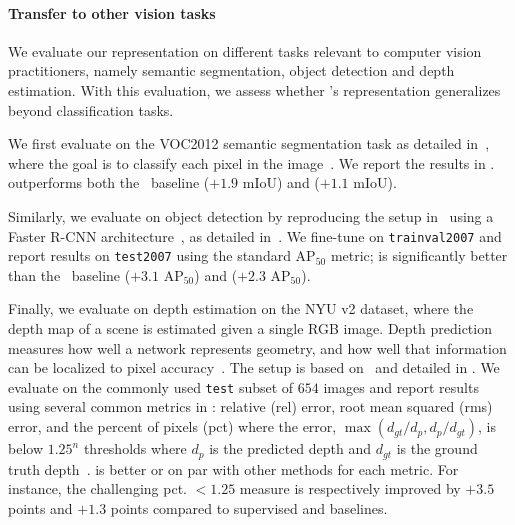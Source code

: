 \begin{table}[t]
    \centering
    \scriptsize
    
     \vspace{0.5em}
     \caption{Transfer learning results from ImageNet (IN) with the standard ResNet-50 architecture.}
     \label{tab:transfer_learning}
     \vspace{-0.8em}
\end{table}

\paragraph{Transfer to other vision tasks} We evaluate our representation on different tasks relevant to computer vision practitioners, namely semantic segmentation, object detection and depth estimation. With this evaluation, we assess whether \algo's representation generalizes beyond classification tasks.

We first evaluate \algo on the VOC2012 semantic segmentation task as detailed in~, where the goal is to classify each pixel in the image~\cite{long2015fully}. We report the results in . \algo outperforms both the \supervisedbaseline~baseline ($+1.9$ mIoU) and \simclr ($+1.1$ mIoU).

Similarly, we evaluate on object detection by reproducing the setup in~\cite{MOCO} using a Faster R-CNN architecture~\cite{ren2015faster}, as detailed in~. We fine-tune on  \texttt{trainval2007\xspace} and report results on  \texttt{test2007\xspace} using the standard AP$_{50}$ metric; \algo is significantly better than the \supervisedbaseline~baseline ($+3.1$ AP$_{50}$) and \simclr ($+2.3$ AP$_{50}$).

Finally, we evaluate on depth estimation on the NYU v2 dataset, where the depth map of a scene is estimated given a single RGB image. Depth prediction measures how well a network represents geometry, and how well that information can be localized to pixel accuracy~\cite{doersch2017multi}. The setup is based on~\cite{laina2016depth} and detailed in . We evaluate on the commonly used  \texttt{test\xspace} subset of $654$ images and report results using several common metrics in : relative (rel) error, root mean squared (rms) error, and the percent of pixels (pct) where the error, $\max (d_{gt}/d_{p}, d_{p}/d_{gt})$, is below $1.25^{n}$ thresholds where $d_p$ is the predicted depth and $d_{gt}$ is the ground truth depth~\cite{doersch2017multi}. \algo is better or on par with other methods for each metric. For instance, the challenging pct.\,$\!\,\!<\!\!1.25$ measure is respectively improved by $+3.5$ points and $+1.3$ points compared to supervised and \simclr baselines.

